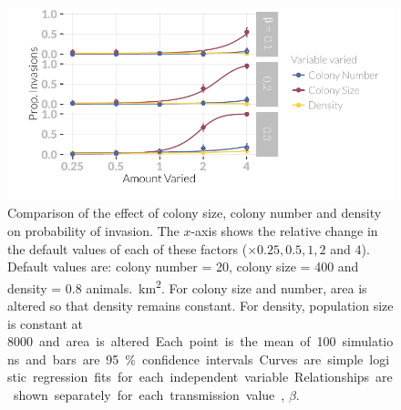 \begin{knitrout}\footnotesize
{}\color{fgcolor}\begin{figure}[t]

{\centering \includegraphics[width=\textwidth]{figure/plotValueChangeMeans-1} 

}

\caption[Comparison of the probability of invasion when population size is altered by changing colony size or colony number.]{
Comparison of the effect of colony size, colony number and density on probability of invasion.
The $x$-axis shows the relative change in the default values of each of these factors ($\times 0.25, 0.5, 1, 2$ and $4$).
Default values are: colony number = 20, colony size = 400 and density = 0.8 animals.\si{\per\square\kilo\metre}.
For colony size and number, area is altered so that density remains constant.
For density, population size is constant at \SI{8000} and area is altered.
Each point is the mean of 100 simulations and bars are 95\% confidence intervals.
Curves are simple logistic regression fits for each independent variable.
Relationships are shown separately for each transmission value, $\beta$.
}\label{fig:plotValueChangeMeans}
\end{figure}


\end{knitrout}







